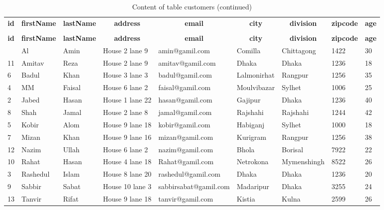 %
%
 \begin{longtable}{|l|l|l|l|l|l|l|l|l|} 
 \hline \endhead \hline \endfoot \hline 
 \caption{Content of table customers} \label{tab:customers-data} \\\hline \multicolumn{1}{|c|}{\textbf{id}} & \multicolumn{1}{|c|}{\textbf{firstName}} & \multicolumn{1}{|c|}{\textbf{lastName}} & \multicolumn{1}{|c|}{\textbf{address}} & \multicolumn{1}{|c|}{\textbf{email}} & \multicolumn{1}{|c|}{\textbf{city}} & \multicolumn{1}{|c|}{\textbf{division}} & \multicolumn{1}{|c|}{\textbf{zipcode}} & \multicolumn{1}{|c|}{\textbf{age}} \\ \hline \hline  \endfirsthead 
\caption{Content of table customers (continued)} \\ \hline \multicolumn{1}{|c|}{\textbf{id}} & \multicolumn{1}{|c|}{\textbf{firstName}} & \multicolumn{1}{|c|}{\textbf{lastName}} & \multicolumn{1}{|c|}{\textbf{address}} & \multicolumn{1}{|c|}{\textbf{email}} & \multicolumn{1}{|c|}{\textbf{city}} & \multicolumn{1}{|c|}{\textbf{division}} & \multicolumn{1}{|c|}{\textbf{zipcode}} & \multicolumn{1}{|c|}{\textbf{age}} \\ \hline \hline \endhead \endfoot
1 & Al & Amin & House 2 lane 9 & amin@gamil.com & Comilla & Chittagong & 1422 & 30 \\ \hline 
11 & Amitav & Reza & House 2 lane 9 & amitav@gamil.com & Dhaka & Dhaka & 1236 & 18 \\ \hline 
6 & Badul & Khan & House 3 lane 3 & badul@gamil.com & Lalmonirhat & Rangpur & 1256 & 35 \\ \hline 
4 & MM & Faisal & House 6 lane 2 & faisal@gamil.com & Moulvibazar & Sylhet & 1006 & 25 \\ \hline 
2 & Jabed & Hasan & House 1 lane 22 & hasan@gamil.com & Gajipur & Dhaka & 1236 & 40 \\ \hline 
8 & Shah & Jamal & House 2 lane 8 & jamal@gamil.com & Rajshahi & Rajshahi & 1244 & 42 \\ \hline 
5 & Kobir & Alom & House 9 lane 18 & kobir@gamil.com & Habiganj & Sylhet & 1000 & 18 \\ \hline 
7 & Mizan & Khan & House 9 lane 16 & mizan@gamil.com & Kurigram & Rangpur & 1256 & 38 \\ \hline 
12 & Nazim & Ullah & House 6 lane 2 & nazim@gamil.com & Bhola & Borisal & 7922 & 22 \\ \hline 
10 & Rahat & Hasan & House 4 lane 18 & Rahat@gamil.com & Netrokona & Mymenshingh & 8522 & 26 \\ \hline 
3 & Rashedul & Islam & House 8 lane 20 & rashedul@gamil.com & Dhaka & Dhaka & 1236 & 20 \\ \hline 
9 & Sabbir & Sabat & House 10 lane 3 & sabbirsabat@gamil.com & Madaripur & Dhaka & 3255 & 24 \\ \hline 
13 & Tanvir & Rifat & House 9 lane 18 & tanvir@gamil.com & Kistia & Kulna & 2599 & 26 \\ \hline 
 \end{longtable}
